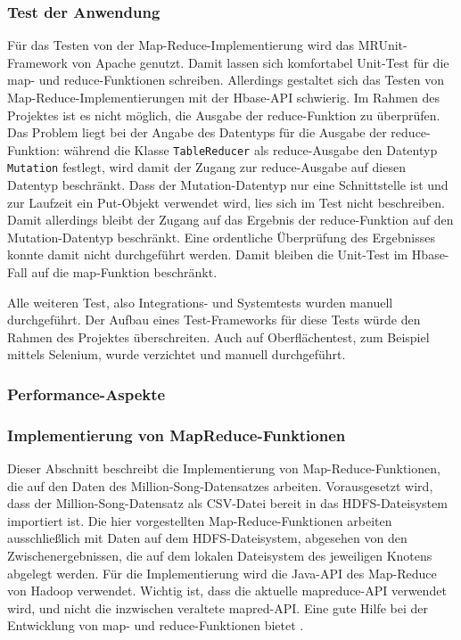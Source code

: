\subsubsection{Test der Anwendung}
Für das Testen von der Map-Reduce-Implementierung wird das MRUnit-Framework von Apache
\cite{mrunit} genutzt. Damit lassen sich komfortabel Unit-Test für die map- und reduce-Funktionen
schreiben. Allerdings gestaltet sich das Testen von Map-Reduce-Implementierungen mit
der Hbase-API schwierig. Im Rahmen des Projektes ist es nicht möglich, die Ausgabe der
reduce-Funktion zu überprüfen. Das Problem liegt bei der Angabe des Datentyps für
die Ausgabe der reduce-Funktion: während die Klasse \texttt{TableReducer} als reduce-Ausgabe
den Datentyp \texttt{Mutation} festlegt, wird damit der Zugang zur reduce-Ausgabe auf diesen
Datentyp beschränkt. Dass der Mutation-Datentyp nur eine Schnittstelle ist und zur
Laufzeit ein Put-Objekt verwendet wird, lies sich im Test nicht beschreiben.
Damit allerdings bleibt der Zugang auf das Ergebnis der reduce-Funktion auf den
Mutation-Datentyp beschränkt. Eine ordentliche Überprüfung des Ergebnisses konnte damit
nicht durchgeführt werden. Damit bleiben die Unit-Test im Hbase-Fall auf die map-Funktion
beschränkt. 

Alle weiteren Test, also Integrations- und Systemtests wurden manuell durchgeführt.
Der Aufbau eines Test-Frameworks für diese Tests würde den Rahmen des Projektes 
überschreiten. Auch auf Oberflächentest, zum Beispiel mittels Selenium, wurde verzichtet
und manuell durchgeführt.

\subsubsection{Performance-Aspekte}



\subsubsection{Implementierung von MapReduce-Funktionen}

Dieser Abschnitt beschreibt die Implementierung von Map-Reduce-Funktionen, die auf den Daten
des Million-Song-Datensatzes arbeiten. Vorausgesetzt wird, dass der Million-Song-Datensatz als
CSV-Datei bereit in das HDFS-Dateisystem importiert ist. Die hier vorgestellten Map-Reduce-Funktionen
arbeiten ausschließlich mit Daten auf dem HDFS-Dateisystem, abgesehen von den Zwischenergebnissen,
die auf dem lokalen Dateisystem des jeweiligen Knotens abgelegt werden.
Für die Implementierung wird die Java-API des Map-Reduce von Hadoop verwendet. Wichtig ist,
dass die aktuelle mapreduce-API verwendet wird, und nicht die inzwischen veraltete mapred-API.
Eine gute Hilfe bei der Entwicklung von map- und reduce-Funktionen bietet \cite{miner2012mapreduce}.

